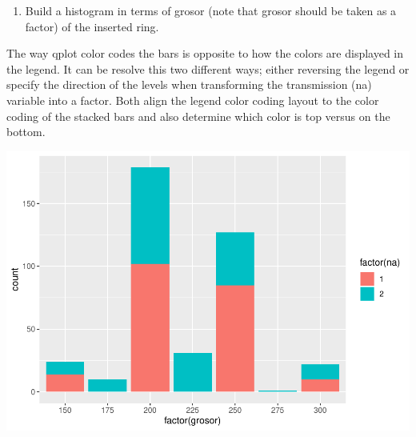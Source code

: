\documentclass[
]{article}
\newenvironment{Shaded}{\begin{snugshade}}{\end{snugshade}}
\newcommand{\DataTypeTok}[1]{\textcolor[rgb]{0.13,0.29,0.53}{#1}}
\newcommand{\DecValTok}[1]{\textcolor[rgb]{0.00,0.00,0.81}{#1}}
\newcommand{\KeywordTok}[1]{\textcolor[rgb]{0.13,0.29,0.53}{\textbf{#1}}}
\newcommand{\NormalTok}[1]{#1}
\newcommand{\OperatorTok}[1]{\textcolor[rgb]{0.81,0.36,0.00}{\textbf{#1}}}
\newcommand{\OtherTok}[1]{\textcolor[rgb]{0.56,0.35,0.01}{#1}}
\newcommand{\StringTok}[1]{\textcolor[rgb]{0.31,0.60,0.02}{#1}}
\providecommand{\tightlist}{%
  \setlength{\itemsep}{0pt}\setlength{\parskip}{0pt}}
\begin{document}
\begin{enumerate}
\def\labelenumi{\arabic{enumi}.}
\setcounter{enumi}{3}
\tightlist
\item
  Build a histogram in terms of grosor (note that grosor should be taken
  as a factor) of the inserted ring.
\end{enumerate}

The way qplot color codes the bars is opposite to how the colors are
displayed in the legend. It can be resolve this two different ways;
either reversing the legend or specify the direction of the levels when
transforming the transmission (na) variable into a factor. Both align
the legend color coding layout to the color coding of the stacked bars
and also determine which color is top versus on the bottom.

\begin{Shaded}
\end{Shaded}

\includegraphics{document_files/figure-latex/unnamed-chunk-6-1.pdf}
\end{document}
